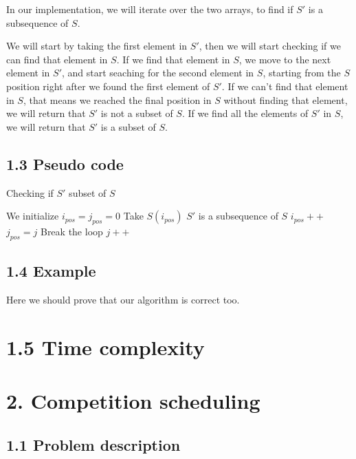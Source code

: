 \documentclass{article}
\begin{document}
In our implementation, we will iterate over the two arrays, to find if $S'$ is a subsequence of $S$.

We will start by taking the first element in $S'$, then we will start checking if we can find that element in $S$. If we find that element in $S$, we move to the next element in $S'$, and start seaching for the second element in $S$, starting from the $S$ position right after we found the first element of $S'$. If we can't find that element in $S$, that means we reached the final position in $S$ without finding that element, we will return that $S'$ is not a subset of $S$. If we find all the elements of $S'$ in $S$, we will return that $S'$ is a subset of $S$.

\subsection*{1.3 Pseudo code}

\begin{algorithm}[H]
\caption{Checking if $S'$ subset of $S$}
\begin{algorithmic}[1]
\State We initialize $i_{pos} = j_{pos} = 0$
 \State Take $S(i_{pos})$
    \State $S'$ is a subsequence of $S$
   \EndIf
    \State $i_{pos}++$
    \State $j_{pos} = j$
    \State Break the loop
   \EndIf
  \EndIf
   \State $j++$
  \EndIf
 \EndFor
\EndWhile
\end{algorithmic}
\end{algorithm}

\subsection*{1.4 Example}

Here we should prove that our algorithm is correct too.

\section*{1.5 Time complexity}

\section*{2. Competition scheduling}

\subsection*{1.1 Problem description}
\end{document}

